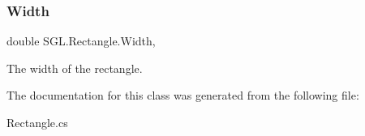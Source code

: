 \subsubsection{\texorpdfstring{Width}{Width}}
{\footnotesize\ttfamily double S\+G\+L.\+Rectangle.\+Width\hspace{0.3cm}{\ttfamily [get]}, {\ttfamily [set]}}



The width of the rectangle. 



The documentation for this class was generated from the following file\+:\begin{DoxyCompactItemize}
\item 
Rectangle.\+cs\end{DoxyCompactItemize}
